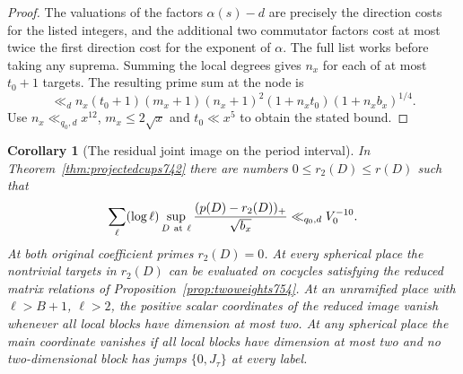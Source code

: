 \documentclass[a4paper,11pt]{article}
\newtheorem{corollary}[proposition]{Corollary}
\theoremstyle{definition}
\theoremstyle{remark}
\numberwithin{equation}{section}
\begin{document}
\begin{proof}
The valuations of the factors \(\alpha(s)-d\) are precisely
the direction costs for the listed integers, and the additional
two commutator factors cost at most twice the first direction
cost for the exponent of \(\alpha\). The full list works before
taking any suprema. Summing the local degrees gives \(n_x\)
for each of at most \(t_0+1\) targets. The resulting prime sum
at the node is
\[
 \ll_d n_x(t_0+1)(m_x+1)(n_x+1)^2
                      (1+n_xt_0)(1+n_x b_x)^{1/4}.
\]
Use \(n_x\ll_{q_0,d}x^{12}\), \(m_x\le2\sqrt x\) and
\(t_0\ll x^5\) to obtain the stated bound.
\end{proof}

\begin{corollary}[The residual joint image on the period interval]
\leavevmode\label{cor:twoperiod754}
In Theorem~\ref{thm:projectedcups742} there are numbers
\(0\le r_2(D)\le r(D)\) such that
\[
 \sum_\ell(\log\ell)\sup_{D\ {\rm at}\ \ell}
        \frac{(p(D)-r_2(D))_+}{\sqrt{b_x}}
                  \ll_{q_0,d} V_0^{-10}.
\]
At both original coefficient primes \(r_2(D)=0\). At every
spherical place the nontrivial targets in \(r_2(D)\) can be
evaluated on cocycles satisfying the reduced matrix relations
of Proposition~\ref{prop:twoweights754}. At an unramified
place with \(\ell>B+1\), \(\ell>2\), the positive scalar
coordinates of the reduced image vanish whenever all local
blocks have dimension at most two. At any spherical place the
main coordinate vanishes if all local blocks have dimension at
most two and no two-dimensional block has jumps \(\{0,J_\tau\}\)
at every label.
\end{corollary}
\end{document}
